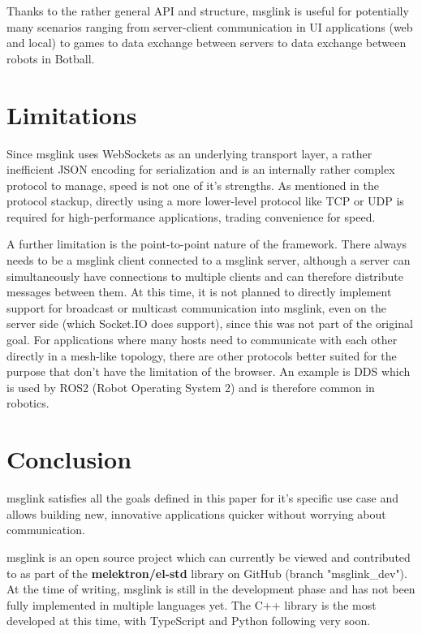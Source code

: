 \documentclass[conference]{IEEEtran}
\begin{document}
Thanks to the rather general API and structure, msglink is useful for potentially many scenarios ranging from server-client communication in UI applications (web and local) to games to data exchange between servers to data exchange between robots in Botball.


\section{Limitations}

Since msglink uses WebSockets as an underlying transport layer, a rather inefficient JSON encoding for serialization and is an internally rather complex protocol to manage, speed is not one of it's strengths. As mentioned in the protocol stackup, directly using a more lower-level protocol like TCP or UDP is required for high-performance applications, trading convenience for speed.

A further limitation is the point-to-point nature of the framework. There always needs to be a msglink client connected to a msglink server, although a server can simultaneously have connections to multiple clients and can therefore distribute messages between them. At this time, it is not planned to directly implement support for broadcast or multicast communication into msglink, even on the server side (which Socket.IO does support), since this was not part of the original goal. For applications where many hosts need to communicate with each other directly in a mesh-like topology, there are other protocols better suited for the purpose that don't have the limitation of the browser. An example is DDS which is used by ROS2 (Robot Operating System 2) and is therefore common in robotics.


\section{Conclusion}

msglink satisfies all the goals defined in this paper for it's specific use case and allows building new, innovative applications quicker without worrying about communication.

msglink is an open source project which can currently be viewed and contributed to as part of the \textbf{melektron/el-std} library on GitHub (branch "msglink\_dev"). At the time of writing, msglink is still in the development phase and has not been fully implemented in multiple languages yet. The C++ library is the most developed at this time, with TypeScript and Python following very soon. \cite{el-std-gh}
\end{document}
